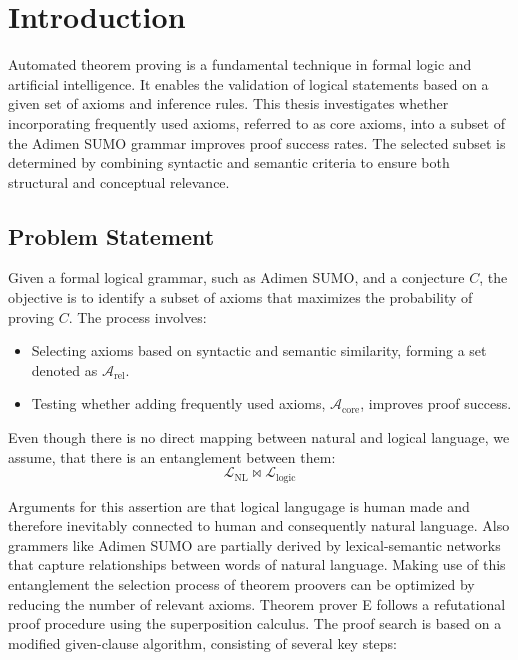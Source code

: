 \documentclass[english,version-2020-11]{uzl-thesis}
\begin{document}
%
%


\chapter{Introduction}
\label{chapter-introduction}

Automated theorem proving is a fundamental technique in formal logic and artificial intelligence. 
It enables the validation of logical statements based on a given set of axioms and inference rules. 
This thesis investigates whether incorporating frequently used axioms, referred to as core axioms, into a subset of the Adimen SUMO grammar improves proof success rates. 
The selected subset is determined by combining syntactic and semantic criteria to ensure both structural and conceptual relevance.

\section{Problem Statement}
Given a formal logical grammar, such as Adimen SUMO, and a conjecture \( C \), the objective is to identify a subset of axioms that maximizes the probability of proving \( C \). The process involves:
\begin{itemize}
    \item Selecting axioms based on syntactic and semantic similarity, forming a set denoted as \( \mathcal{A}_{\text{rel}} \).
    \item Testing whether adding frequently used axioms, \( \mathcal{A}_{\text{core}} \), improves proof success.
\end{itemize}

Even though there is no direct mapping between natural and logical language, we assume, that there is an entanglement between them: \\
\begin{equation}
    \mathcal{L}_{\text{NL}} \bowtie \mathcal{L}_{\text{logic}}
\end{equation}

Arguments for this assertion are that logical langugage is human made and therefore inevitably connected to human and consequently natural language.
Also grammers like Adimen SUMO are partially derived by lexical-semantic networks that capture relationships between words of natural language.
Making use of this entanglement the selection process of theorem proovers can be optimized by reducing the number of relevant axioms.
Theorem prover E follows a refutational proof procedure using the superposition calculus. The proof search is based on a modified given-clause algorithm, consisting of several key steps:
\end{document}
